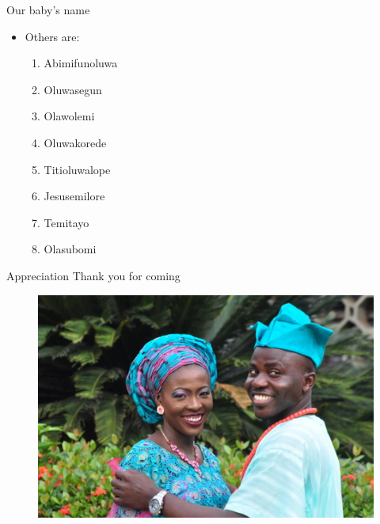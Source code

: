 \documentclass[11pt,pdf]{beamer}
\begin{document}
\begin{frame}[t]{Our baby's name}
\begin{itemize}
	\item Others are:
	\begin{enumerate}
		\item \textcolor{blue!45!black}{Abimifunoluwa}
		\pause
		\item \textcolor{blue!45!black}{Oluwasegun}
		\pause
		\item \textcolor{blue!45!black}{Olawolemi}
		\pause
		\item \textcolor{blue!45!black}{Oluwakorede}
		\item \textcolor{blue!45!black}{Titioluwalope}
		\pause
		\item \textcolor{blue!45!black}{Jesusemilore}
		\pause
		\item \textcolor{blue!45!black}{Temitayo}
		\pause
		\item \textcolor{blue!45!black}{Olasubomi}
	\end{enumerate}
\end{itemize}

\end{frame}










\begin{frame}{Appreciation}
\textcolor{blue!45!black}{\Large{Thank you for coming}}
\begin{figure}[t]
	\centering
	\includegraphics[width=0.80\linewidth]{Images/ThankU1.JPG}
\end{figure}
\end{frame}
\end{document}
